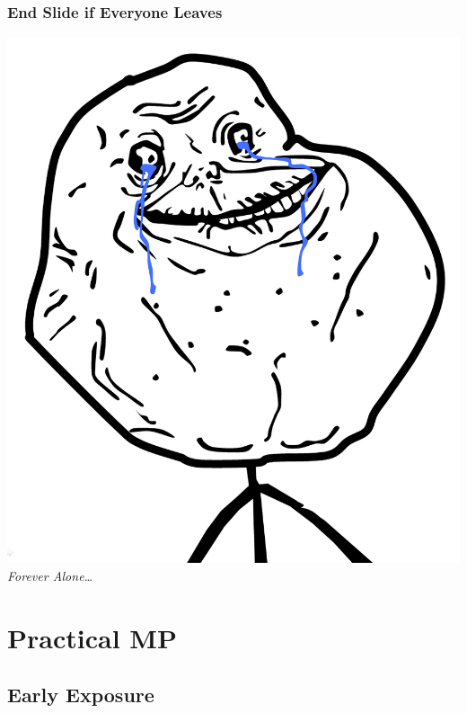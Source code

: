 \documentclass[slidestop,compress,mathserif]{beamer}
\begin{document}
\begin{frame}
	\frametitle{End Slide if Everyone Leaves}
	\begin{center}
		\includegraphics[scale=0.15]{img/forever_alone.png}
		\vskip 0.5cm
		\emph{Forever Alone{\ldots}}
	\end{center}
\end{frame}


\section{Practical MP} %
\label{sub:practical_metaprogramming}

\subsection{Early Exposure} %
\label{sub:early_exposure}
\end{document}
